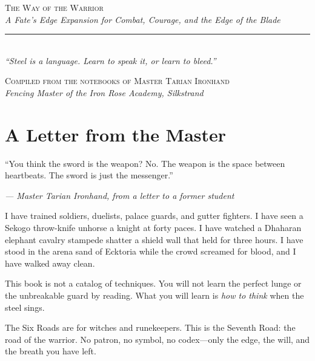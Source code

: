 \documentclass[9pt,a5paper]{extbook}
\begin{document}


\frontmatter
\thispagestyle{empty}

\begin{center}
\vspace*{1.5cm}

{\LARGE\scshape\color{darkblue} The Way of the Warrior}\\[0.8cm]

{\normalsize\itshape A Fate's Edge Expansion for Combat, Courage, and the Edge of the Blade}\\[1.0cm]

\rule{0.5\textwidth}{1.0pt}\\[0.8cm]

{\small\textit{``Steel is a language. Learn to speak it, or learn to bleed.''}}\\[1.5cm]

\vfill

{\footnotesize\textsc{Compiled from the notebooks of Master Tarian Ironhand}\\[0.2em]
\textit{Fencing Master of the Iron Rose Academy, Silkstrand}}

\end{center}

\clearpage

\section*{A Letter from the Master}

\epigraph{``You think the sword is the weapon? No. The weapon is the space between heartbeats. The sword is just the messenger.''}{\textit{--- Master Tarian Ironhand, from a letter to a former student}}

I have trained soldiers, duelists, palace guards, and gutter fighters. I have seen a Sekogo throw-knife unhorse a knight at forty paces. I have watched a Dhaharan elephant cavalry stampede shatter a shield wall that held for three hours. I have stood in the arena sand of Ecktoria while the crowd screamed for blood, and I have walked away clean.

This book is not a catalog of techniques. You will not learn the perfect lunge or the unbreakable guard by reading. What you will learn is \textit{how to think} when the steel sings.

The Six Roads are for witches and runekeepers. This is the Seventh Road: the road of the warrior. No patron, no symbol, no codex---only the edge, the will, and the breath you have left.
\end{document}
